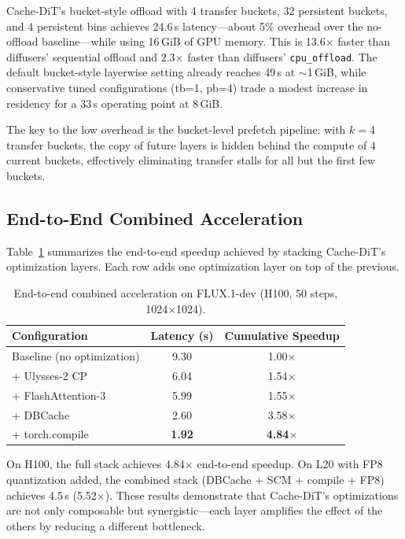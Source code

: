 \documentclass[10pt]{article}
\begin{document}
Cache-DiT's bucket-style offload with 4 transfer buckets, 32 persistent buckets, and 4 persistent bins achieves 24.6\,s latency---about 5\% overhead over the no-offload baseline---while using 16\,GiB of GPU memory. This is 13.6$\times$ faster than diffusers' sequential offload and 2.3$\times$ faster than diffusers' \texttt{cpu\_offload}. The default bucket-style layerwise setting already reaches 49\,s at $\sim$1\,GiB, while conservative tuned configurations (tb=1, pb=4) trade a modest increase in residency for a 33\,s operating point at 8\,GiB.

The key to the low overhead is the bucket-level prefetch pipeline: with $k=4$ transfer buckets, the copy of future layers is hidden behind the compute of 4 current buckets, effectively eliminating transfer stalls for all but the first few buckets.

\subsection{End-to-End Combined Acceleration}
\label{sec:results}

Table~\ref{tab:e2e} summarizes the end-to-end speedup achieved by stacking Cache-DiT's optimization layers. Each row adds one optimization layer on top of the previous.

\begin{table}[htbp]
\centering
\caption{End-to-end combined acceleration on FLUX.1-dev (H100, 50 steps, 1024$\times$1024).}
\label{tab:e2e}
\begin{tabular}{lcc}
\toprule
\textbf{Configuration} & \textbf{Latency (s)} & \textbf{Cumulative Speedup} \\
\midrule
Baseline (no optimization) & 9.30 & 1.00$\times$ \\
+ Ulysses-2 CP & 6.04 & 1.54$\times$ \\
+ FlashAttention-3 & 5.99 & 1.55$\times$ \\
+ DBCache & 2.60 & 3.58$\times$ \\
+ torch.compile & \textbf{1.92} & \textbf{4.84$\times$} \\
\bottomrule
\end{tabular}
\end{table}

On H100, the full stack achieves 4.84$\times$ end-to-end speedup. On L20 with FP8 quantization added, the combined stack (DBCache + SCM + compile + FP8) achieves 4.5\,s (5.52$\times$). These results demonstrate that Cache-DiT's optimizations are not only composable but synergistic---each layer amplifies the effect of the others by reducing a different bottleneck.
\end{document}
